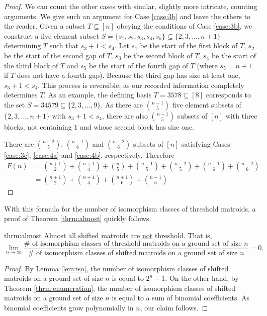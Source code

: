 \documentclass[10pt,a4paper]{amsart}
\theoremstyle{definition}
\theoremstyle{plain}
\begin{document}
\begin{proof}
 We can count the other cases with similar, slightly more intricate, counting arguments. We give such an argument for Case \ref{case:3b} and leave the others to the reader. Given a subset $T\subseteq [n]$ obeying the conditions of Case \ref{case:3b}, we construct a five element subset $S=\{s_{1},s_{2},s_{3},s_{4},s_{5}\}\subseteq \{2,3,\ldots,n+1\}$ determining $T$ such that $s_{3}+1<s_{4}$. Let $s_{1}$ be the start of the first block of $T$, $s_{2}$ be the start of the second gap of $T$, $s_{3}$ be the second block of $T$, $s_{4}$ be the start of the third block of $T$ and $s_{5}$ be the start of the fourth gap of $T$ (where $s_{5}=n+1$ if $T$ does not have a fourth gap). Because the third gap has size at least one, $s_{3}+1<s_{4}$. This process is reversible, as our recorded information completely determines $T$. As an example, the defining basis $T=3578\subseteq [8]$ corresponds to the set $S=34579\subseteq \{2,3,\ldots,9\}$. As there are $\binom{n-1}{5}$ five element subsets of $\{2,3,\ldots,n+1\}$ with $s_3+1<s_4$, there are also $\binom{n-1}{5}$ subsets of $[n]$ with three blocks, not containing $1$ and whose second block has size one.

 There are $\binom{n-2}{5}$, $\binom{n-1}{6}$ and $\binom{n-2}{6}$ subsets of $[n]$ satisfying Cases \ref{case:3c}, \ref{case:4a} and \ref{case:4b}, respectively. Therefore
 \begin{align*}
 \label{eq:2}
   F(n) &= \binom{n+1}{2}+ \binom{n+1}{4} + \binom{n}{5}+ \binom{n-1}{5} + \binom{n-2}{5} + \binom{n-1}{6} + \binom{n-2}{6}\\
          &= \binom{n+1}{2} + \binom{n+1}{4} + \binom{n+1}{6} + \binom{n-1}{6}
 \end{align*}
 
\end{proof}  

With this formula for the number of isomorphism classes of threshold matroids, a proof of Theorem \ref{thrm:almost} quickly follows.

\begin{repintrotheorem}{thrm:almost}
  Almost all shifted matroids are \underline{not} threshold. That is,
  \[\lim_{n\to\infty}\frac{\text{$\#$ of isomorphism classes of threshold matroids on a ground set of size $n$}}{\text{$\#$ of isomorphism classes of shifted matroids on a ground set of size $n$}}=0. \]
\end{repintrotheorem}
\begin{proof}
  By Lemma \ref{lem:iso}, the number of isomorphism classes of shifted matroids on a ground set of size $n$ is equal to $2^n-1$. On the other hand, by Theorem \ref{thrm:enumeration}, the number of isomorphism classes of shifted matroids on a ground set of size $n$ is equal to a sum of binomial coefficients. As binomial coefficients grow polynomially in $n$, our claim follows.
\end{proof}
\end{document}
